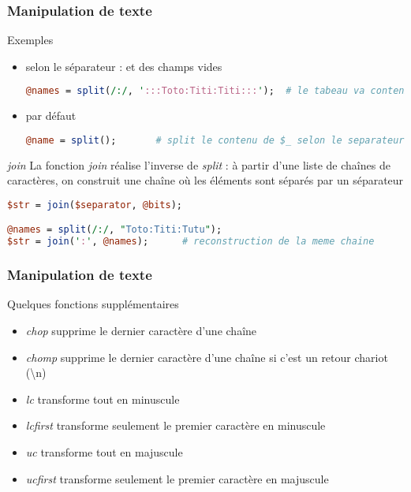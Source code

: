 \begin{frame}[fragile]
  \frametitle{Manipulation de texte}

  \begin{exampleblock}{Exemples}
    \begin{itemize}
    \item selon le séparateur : et des champs vides
      \begin{lstlisting}[language=perl]
@names = split(/:/, ':::Toto:Titi:Titi:::');  # le tabeau va contenir des cases vides
      \end{lstlisting}
    \item par défaut
      \begin{lstlisting}[language=perl]
@name = split();       # split le contenu de $_ selon le separateur espace
      \end{lstlisting}
    \end{itemize}
  \end{exampleblock}

  \begin{alertblock}{\textit{join}}
    La fonction \textit{join} réalise l'inverse de \textit{split} : à
    partir d'une liste de chaînes de caractères, on construit une chaîne où
    les éléments sont séparés par un séparateur
    \begin{lstlisting}[language=perl]
$str = join($separator, @bits);

@names = split(/:/, "Toto:Titi:Tutu");
$str = join(':', @names);      # reconstruction de la meme chaine
    \end{lstlisting}
  \end{alertblock}
\end{frame}

\begin{frame}[fragile]
  \frametitle{Manipulation de texte}

  \begin{block}{Quelques fonctions supplémentaires}
    \begin{itemize}
    \item \textit{chop} supprime le dernier caractère d'une chaîne
    \item \textit{chomp} supprime le dernier caractère d'une chaîne si c'est
      un retour chariot (\textbackslash n)
    \item \textit{lc} transforme tout en minuscule
    \item \textit{lcfirst} transforme seulement le premier caractère en
      minuscule
    \item \textit{uc} transforme tout en majuscule
    \item \textit{ucfirst} transforme seulement le premier caractère en
      majuscule
    \end{itemize}
  \end{block}

\end{frame}
